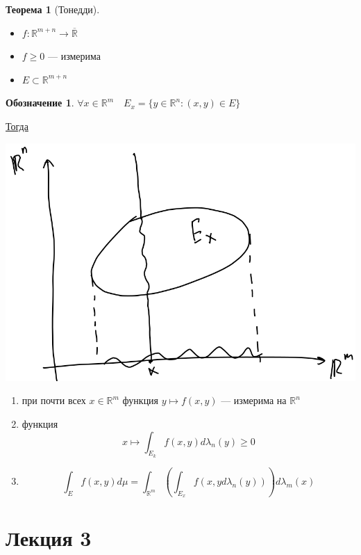 \documentclass[russ,oneside]{book}
\newcommand{\R}{\mathbb{R}}
\theoremstyle{plain}
\theoremstyle{remark}
\theoremstyle{definition}
\newtheorem{theorem}{Теорема}[section]
\newtheorem*{symb}{Обозначение}
\begin{document}
\begin{theorem}[Тонедди]
\-
\begin{itemize}
\item \(f: \R^{m + n} \to \overline{\R}\)
\item \(f \ge 0\) --- измерима
\item \(E \subset \R^{m + n}\)
\end{itemize}
\begin{symb}
\(\forall x \in \R^m\quad E_x = \{ y\in\R^n : (x, y) \in E\}\)
\end{symb}
\uline{Тогда}
\begin{center}
\includegraphics[scale=0.3]{2_4.png}
\end{center}
\begin{enumerate}
\item при почти всех \(x \in \R^m\) функция \(y\mapsto f(x, y)\) --- измерима на \(\R^n\)
\item функция \[ x \mapsto \int_{E_k} f(x, y) d\lambda_n(y) \ge 0 \]
\item \[ \int_E f(x, y) d\mu = \int_{\R^m}\left(\int_{E_x} f(x, y d\lambda_n(y))\right)d\lambda_m(x) \]
\end{enumerate}
\end{theorem}
\chapter{Лекция 3}
\label{sec:orgaa44b63}
\newcommand{\X}{\mathcal{X}}
\newcommand{\A}{\mathfrak{A}}
\end{document}
